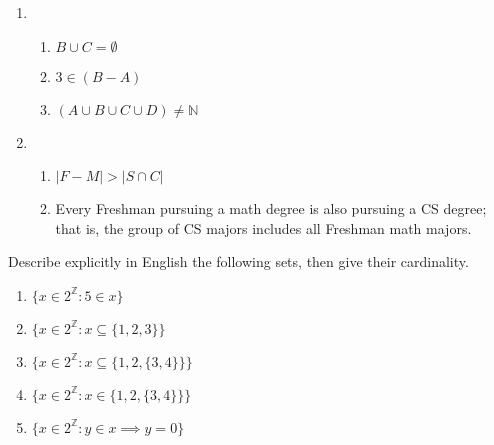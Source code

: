 \documentclass{article}
\newcommand{\Z}{\mathbb{Z}}
\theoremstyle{definition}
\begin{document}
\begin{solution}
\begin{enumerate}
    \item\begin{enumerate}
        \item$B\cup C=\emptyset$
        \item$3\in(B-A)$
        \item$(A\cup B\cup C\cup D)\neq\mathbb{N}$
    \end{enumerate}
    \item\begin{enumerate}
        \item$|F-M|>|S\cap C|$
        \item Every Freshman pursuing a math degree is also pursuing a CS degree; that is, the group of CS majors includes all Freshman math majors.
    \end{enumerate}
\end{enumerate}
\end{solution}
\begin{question}
Describe explicitly in English the following sets, then give their cardinality.
\begin{enumerate}
\item $\{x \in 2^{\Z} : 5 \in x \}$
\item $\{x \in 2^{\Z} : x \subseteq \{ 1, 2, 3\} \}$
\item $\{x \in 2^{\Z} : x \subseteq \{ 1, 2, \{3, 4\} \} \}$
\item $\{x \in 2^{\Z} : x \in \{ 1, 2, \{3, 4\} \} \}$
\item $\{x \in 2^{\Z} : y \in x \implies y = 0 \}$
\end{enumerate}
\end{question}
\end{document}
